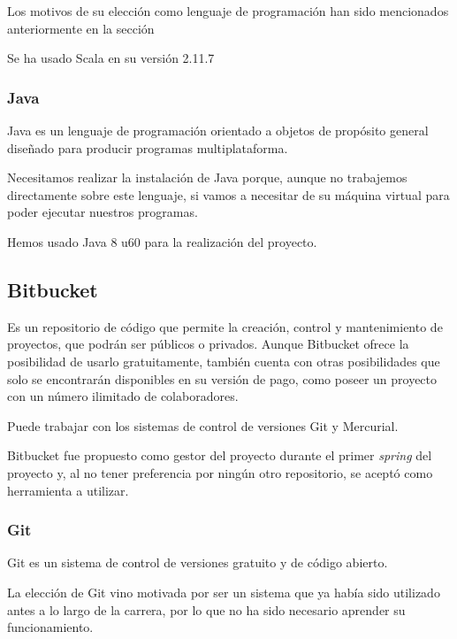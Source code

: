Los motivos de su elección como lenguaje de programación han sido mencionados anteriormente en la sección 

Se ha usado Scala en su versión 2.11.7

\subsubsection{Java}

Java es un lenguaje de programación orientado a objetos de propósito general diseñado para producir programas multiplataforma.

Necesitamos realizar la instalación de Java porque, aunque no trabajemos directamente sobre este lenguaje, si vamos a necesitar de su máquina virtual para poder ejecutar nuestros programas.


Hemos usado Java 8 u60 para la realización del proyecto.

\subsection{Bitbucket}\label{DefBitbucket}
Es un repositorio de código que permite la creación, control y mantenimiento de proyectos, que podrán ser públicos o privados. Aunque Bitbucket ofrece la posibilidad de usarlo gratuitamente, también cuenta con otras posibilidades que solo se encontrarán disponibles en su versión de pago, como poseer un proyecto con un número ilimitado de colaboradores.

Puede trabajar con los sistemas de control de versiones Git y Mercurial.

Bitbucket fue propuesto como gestor del proyecto durante el primer \textit{spring} del proyecto y, al no tener preferencia por ningún otro repositorio, se aceptó como herramienta a utilizar.

\subsubsection{Git}

Git es un sistema de control de versiones gratuito y de código abierto.

La elección de Git vino motivada por ser un sistema que ya había sido utilizado antes a lo largo de la carrera, por lo que no ha sido necesario aprender su funcionamiento.

